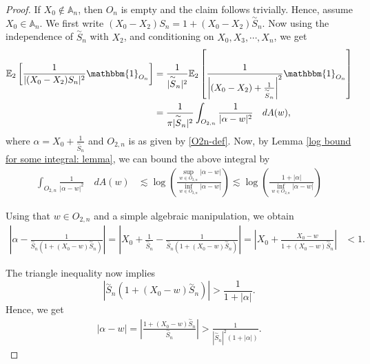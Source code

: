 \documentclass[9pt,a4paper,reqno]{amsart}
\newcommand{\tildea}[1]{\overset{\sim}{#1}}
\theoremstyle{mine}
\theoremstyle{definition}
\theoremstyle{remark}
\newcommand{\mb}{\mathbb}
\begin{document}
\begin{proof}
If $X_0 \notin \mb{A}_n$, then $O_n$ is empty and the claim follows trivially. Hence, assume $X_0 \in \mb{A}_n$. We first write $(X_0 - X_2)S_n = 1 + (X_0 - X_2)\tildea{S}_n$. Now using the independence of $\tildea{S}_n$ with $X_2$, and conditioning on $X_0,X_3, \cdots, X_n$, we get 
\begin{align*}
         \mathbb{E}_2\left[  \frac{1}{|(X_0-X_2)S_n|^2} \mathbbm{1}_{{O}_n}
     \right]&=\frac{1}{|\tildea{S}_n|^2}\mathbb{E}_2\left[  \frac{1}{\left|(X_0-X_2)+ \frac{1}{\tildea{S}_n}\right|^2} \mathbbm{1}_{O_n}
     \right]\\
     &= \frac{1}{\pi|\tildea{S}_n|^2} \int_{O_{2,n}} \frac{1}{|\alpha-w|^2} \quad dA(w),
    \end{align*}
    where $\alpha= X_0+ \frac{1}{\tildea{S}_n} $ and $O_{2,n}$ is as given by \eqref{O2n-def}. Now, by Lemma \ref{log bound for some integral: lemma}, we can bound the above integral by
    \begin{align}\label{inf sup}
         \int_{O_{2,n}} \frac{1}{|\alpha-w|^2} \quad dA(w)&\lesssim  \log\left(\frac{\sup_{w \in O_{2,n}} |\alpha-w|}{\inf_{w \in O_{2,n}} |\alpha-w|}\right) \lesssim \log\left(\frac{1+|\alpha|}{\inf_{w \in O_{2,n}} |\alpha-w|}\right) 
    \end{align}
    
  Using that $w\in O_{2,n}$ and a simple algebraic manipulation, we obtain 
    \begin{align*}
     \left| \alpha - \frac{1}{\tildea{S}_n(1+(X_0-w)\tildea{S}_n)} \right| =\left| X_0 + \frac{1}{\tildea{S}_n} - \frac{1}{\tildea{S}_n(1+(X_0-w)\tildea{S}_n)} \right|
   = \left| X_0 + \frac{X_0-w}{1+(X_0-w)\tildea{S}_n} \right| 
    &< 1.
\end{align*}

The triangle inequality now implies 
\[ |\tildea{S}_n(1+(X_0-w)\tildea{S}_n)| > \frac{1}{1+ |\alpha|}.\]
Hence, we get
 \begin{align}\label{lb}
       |\alpha-w|= \left|\frac{1+(X_0-w)\tildea{S}_n}{\tildea{S}_n} \right| > \frac{1}{|\tildea{S}_n|^2(1+|\alpha|)}. 
    \end{align}
    

\end{proof}
\end{document}
